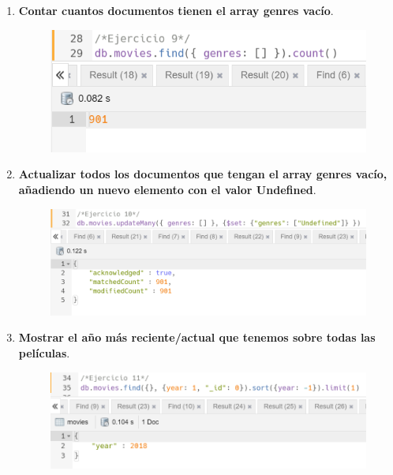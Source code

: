 \documentclass[a4paper,onecolumn]{article}
\begin{document}
\begin{sloppypar}
\begin{enumerate}
\begin{center}
\begin{figure}[h!]
        \end{figure}
    \end{center}
    \item \textbf{Contar cuantos documentos tienen el array genres vacío}.
    \begin{center}
        \begin{figure}[h!]
            \includegraphics[width=\textwidth]{querys/9.png}
        \end{figure}
    \end{center}
    \item \textbf{Actualizar todos los documentos que tengan el array genres vacío, añadiendo un nuevo elemento con el valor Undefined}.
    \begin{center}
        \begin{figure}[h!]
            \includegraphics[width=\textwidth]{querys/10.png}
        \end{figure}
    \end{center}
    \item \textbf{Mostrar el año más reciente/actual que tenemos sobre todas las películas}.
    \begin{center}
        \begin{figure}[h!]
            \includegraphics[width=\textwidth]{querys/11.png}

\end{figure}
\end{center}
\end{enumerate}
\end{sloppypar}
\end{document}
